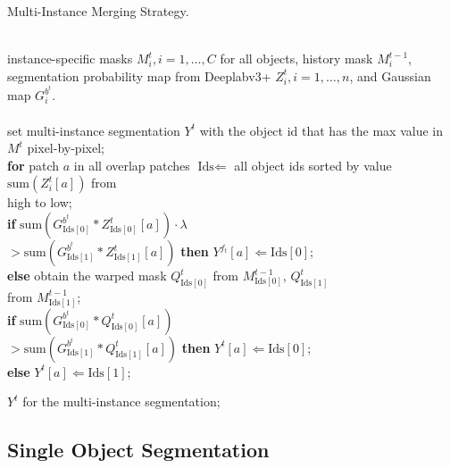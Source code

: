 \documentclass[10pt,twocolumn,letterpaper]{article}
\begin{document}
\begin{algorithm}[t]
\caption{Multi-Instance Merging Strategy.}   
\label{alg:merge}   
\begin{algorithmic}
\REQUIRE ~~\\ 
instance-specific masks ${M^{t}_i},i = 1, \ldots ,C$ for all objects, history mask ${M^{t-1}_i}$, segmentation probability map from Deeplabv3+ ${Z^{t}_i},i = 1, \ldots ,n$, and Gaussian map ${G^{{b^{{t}}}}_i}$.\\ 

\ENSURE ~~\\ 
\STATE set multi-instance segmentation $Y^{t}$ with the object id that has the max value in $M^{t}$  pixel-by-pixel; \\
\textbf{for} {patch $a$ in all overlap patches}  
\STATE \quad $\text{Ids} \Leftarrow$ all object ids sorted by value $\mathrm{sum}\left( {{Z^{t}_i}\left[ a \right]} \right)$ from\\ \quad high to low; \\
\quad \textbf{if} {$\mathrm{sum}\left( {G^{{b^{{t}}}}_{\text{Ids}[0]}}*{{Z^{t}_{\text{Ids}[0]}}\left[ a \right]} \right) \cdot \lambda $ \\ \quad \qquad \qquad $>$$ \mathrm{sum}\left( {G^{{b^{{t}}}}_{\text{Ids}[1]}}*{{Z^{t}_{\text{Ids}[1]}}\left[ a \right]} \right)$} \textbf{then}
\STATE \quad \quad $Y^{f_t}[a] \Leftarrow \text{Ids}[0]$; \\
\quad \textbf{else}
\STATE \qquad obtain the warped mask ${Q^{t}_{\text{Ids}[0]}}$ from ${M^{t-1}_{\text{Ids}[0]}}$, ${Q^{t}_{\text{Ids}[1]}}$ \\ \qquad  from ${M^{t-1}_{\text{Ids}[1]}}$; \\
\qquad \textbf{if} {$\mathrm{sum}\left( {G^{{b^{{t}}}}_{\text{Ids}[0]}}*{{Q^{t}_{\text{Ids}[0]}}\left[ a \right]} \right) $ \\ \qquad \qquad \qquad $>$$  \mathrm{sum}\left( {G^{{b^{{t}}}}_{\text{Ids}[1]}}*{{Q^{t}_{\text{Ids}[1]}}\left[ a \right]} \right)$} \textbf{then}
\STATE \qquad \quad $Y^{t}[a] \Leftarrow \text{Ids}[0]$; \\
\qquad \textbf{else}
\STATE \qquad \quad $Y^{t}[a] \Leftarrow \text{Ids}[1]$;

\RETURN $Y^{t}$ for the multi-instance segmentation; 

\end{algorithmic}  
\end{algorithm} 

\subsection{Single Object Segmentation}
\label{single_object_segmentation}
\vspace{-5pt}
\end{document}
